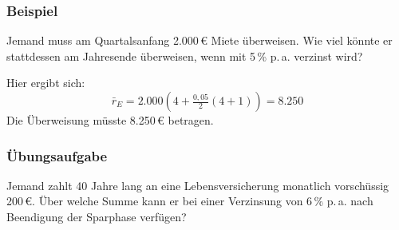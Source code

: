 \subsubsection{Beispiel}

Jemand muss am Quartalsanfang 2.000\,€ Miete überweisen. Wie viel könnte er stattdessen am Jahresende überweisen, wenn mit 5\,\% p.\,a. verzinst wird?

Hier ergibt sich:
\[ \bar{r}_E = 2.000 \left(4 + \tfrac{0{,}05}{2}(4 + 1)\right) = 8.250 \]
Die Überweisung müsste 8.250\,€ betragen.\beispielende

\subsubsection{Übungsaufgabe}

\begin{graukasten}
  Jemand zahlt 40 Jahre lang an eine Lebensversicherung monatlich vorschüssig 200\,€. Über welche Summe kann er bei einer Verzinsung von 6\,\% p.\,a. nach Beendigung der Sparphase verfügen?
\end{graukasten}
